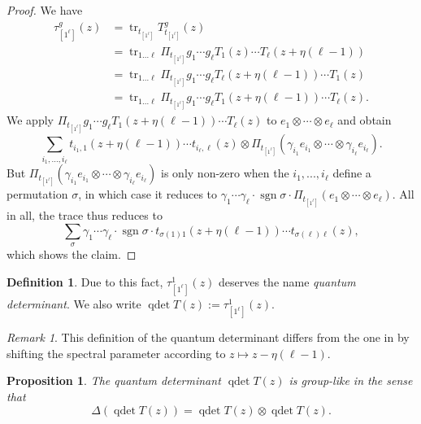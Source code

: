 \documentclass[11pt]{report}
\newtheorem{prop}[theorem]{Proposition}
\theoremstyle{definition}
\newtheorem{definition}[theorem]{Definition}
\theoremstyle{remark}
\newtheorem*{remark}{Remark}
\theoremstyle{remark}
\begin{document}
\begin{proof}
We have
\begin{align*}
\tau_{[1^\ell]}^g(z)
&= \operatorname{tr}_{t_{[1^\ell]}} T_{t_{[1^\ell]}}^g(z) \\
&= \operatorname{tr}_{1...\ell} \Pi_{t_{[1^\ell]}} g_1 \cdots g_\ell T_1(z) \cdots T_\ell(z+\eta(\ell-1)) \\
&= \operatorname{tr}_{1...\ell} \Pi_{t_{[1^\ell]}} g_1 \cdots g_\ell T_\ell(z+\eta(\ell-1)) \cdots T_1(z) \\
&= \operatorname{tr}_{1...\ell} \Pi_{t_{[1^\ell]}} g_1 \cdots g_\ell T_1(z+\eta(\ell-1)) \cdots T_\ell(z).
\end{align*}
We apply $\Pi_{t_{[1^\ell]}} g_1 \cdots g_\ell T_1(z+\eta(\ell-1)) \cdots T_\ell(z)$ to $e_1 \otimes \cdots \otimes e_\ell$ and obtain
\begin{equation*}
\sum_{i_1,...,i_\ell} t_{i_1,1}(z+\eta(\ell-1)) \cdots t_{i_\ell,\ell}(z) \otimes \Pi_{t_{[1^\ell]}} (\gamma_{i_1} e_{i_1} \otimes \cdots \otimes \gamma_{i_\ell} e_{i_\ell}).
\end{equation*}
But $\Pi_{t_{[1^\ell]}} (\gamma_{i_1} e_{i_1} \otimes \cdots \otimes \gamma_{i_\ell} e_{i_\ell})$ is only non-zero when the $i_1,...,i_\ell$ define a permutation $\sigma$, in which case it reduces to $\gamma_1 \cdots \gamma_\ell \cdot \operatorname{sgn} \sigma \cdot \Pi_{t_{[1^\ell]}} (e_1 \otimes \cdots \otimes e_\ell)$. All in all, the trace thus reduces to
\begin{equation*}
\sum_\sigma \gamma_1 \cdots \gamma_\ell \cdot \operatorname{sgn} \sigma \cdot t_{\sigma(1)1}(z+\eta(\ell-1)) \cdots t_{\sigma(\ell)\ell}(z),
\end{equation*}
which shows the claim.
\end{proof}

\begin{definition}
Due to this fact, $\tau_{[1^\ell]}^1(z)$ deserves the name \emph{quantum determinant}. We also write $\operatorname{qdet} T(z) := \tau_{[1^\ell]}^1(z)$.
\end{definition}

\begin{remark}
This definition of the quantum determinant differs from the one in \cite{book:molev} by shifting the spectral parameter according to $z \mapsto z-\eta(\ell-1)$.
\end{remark}

\begin{prop}\label{prop:quantumDetGroupLike}
The quantum determinant $\operatorname{qdet} T(z)$ is group-like in the sense that
\begin{equation*}
\Delta(\operatorname{qdet} T(z)) = \operatorname{qdet} T(z) \otimes \operatorname{qdet} T(z).
\end{equation*}
\end{prop}
\end{document}
